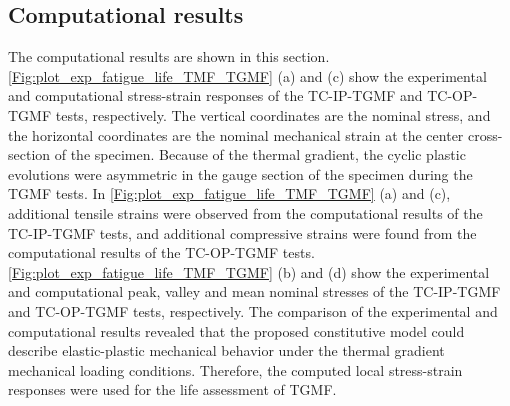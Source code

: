 \documentclass[preprint,5p,twocolumn,11pt,sort&compress]{elsarticle}
\begin{document}
\renewcommand\arraystretch{1}

\subsection{Computational results}
\noindent
The computational results are shown in this section. \autoref{Fig:plot_exp_fatigue_life_TMF_TGMF} (a) and (c) show the experimental and computational stress-strain responses of the TC-IP-TGMF and TC-OP-TGMF tests, respectively. The vertical coordinates are the nominal stress, and the horizontal coordinates are the nominal mechanical strain at the center cross-section of the specimen. Because of the thermal gradient, the cyclic plastic evolutions were asymmetric in the gauge section of the specimen during the TGMF tests. In \autoref{Fig:plot_exp_fatigue_life_TMF_TGMF} (a) and (c), additional tensile strains were observed from the computational results of the TC-IP-TGMF tests, and additional compressive strains were found from the computational results of the TC-OP-TGMF tests. \autoref{Fig:plot_exp_fatigue_life_TMF_TGMF} (b) and (d) show the experimental and computational peak, valley and mean nominal stresses of the TC-IP-TGMF and TC-OP-TGMF tests, respectively. The comparison of the experimental and computational results revealed that the proposed constitutive model could describe elastic-plastic mechanical behavior under the thermal gradient mechanical loading conditions. Therefore, the computed local stress-strain responses were used for the life assessment of TGMF.
\end{document}
